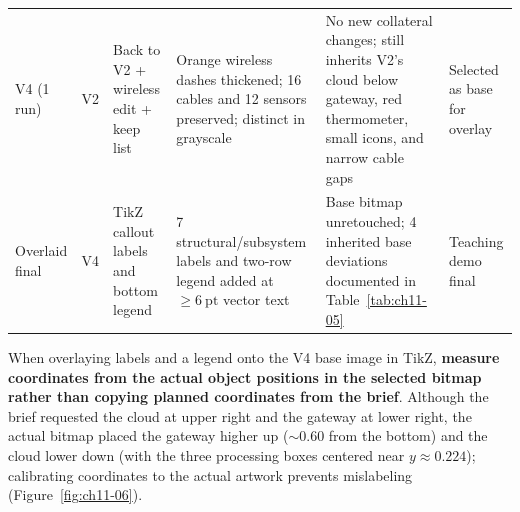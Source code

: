 \begin{table}[htbp]
\begin{tabularx}{\linewidth}{@{}l>{\raggedright\arraybackslash}p{13mm}>{\raggedright\arraybackslash}p{21mm}YY>{\raggedright\arraybackslash}p{18mm}@{}}
V4 (1 run) & V2 & Back to V2 + wireless edit + keep list & Orange wireless dashes thickened; 16 cables and 12 sensors preserved; distinct in grayscale & No new collateral changes; still inherits V2's cloud below gateway, red thermometer, small icons, and narrow cable gaps & Selected as base for overlay \\
Overlaid final & V4 & TikZ callout labels and bottom legend & 7 structural/subsystem labels and two-row legend added at $\ge 6\ \text{pt}$ vector text & Base bitmap unretouched; 4 inherited base deviations documented in Table~\ref{tab:ch11-05} & Teaching demo final \\
\bottomrule
\end{tabularx}
\end{table}

When overlaying labels and a legend onto the V4 base image in TikZ, \textbf{measure coordinates from the actual object positions in the selected bitmap rather than copying planned coordinates from the brief}. Although the brief requested the cloud at upper right and the gateway at lower right, the actual bitmap placed the gateway higher up ($\sim 0.60$ from the bottom) and the cloud lower down (with the three processing boxes centered near $y \approx 0.224$); calibrating coordinates to the actual artwork prevents mislabeling (Figure~\ref{fig:ch11-06}).


